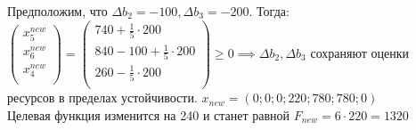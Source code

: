 Предположим, что $\Delta b_2 = -100, \Delta b_3 = -200$. Тогда:\\
$\begin{pmatrix}
x_5^{new}\\
x_6^{new}\\
x_4^{new}\\
\end{pmatrix} = \begin{pmatrix}
740 + \frac{1}{5} \cdot 200 \\
840 - 100 + \frac{1}{5} \cdot 200 \\
260 - \frac{1}{5} \cdot 200 \\
\end{pmatrix} \ge 0 \implies \Delta b_2, \Delta b_3$ сохраняют оценки ресурсов в пределах устойчивости.
$x_{new} = (0; 0; 0; 220; 780; 780; 0)$\\
Целевая функция изменится на 240 и станет равной $F_{new} = 6 \cdot 220 = 1320$
